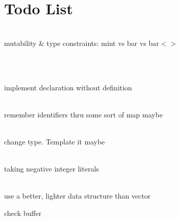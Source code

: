 \chapter{Todo List }
\hypertarget{todo}{}\label{todo}

\begin{DoxyRefList}
\item[{\parbox[t]{\linewidth}{Struct \doxylink{structast_1_1_declaration}{ast::\+Declaration} }}]\hfill \\
\label{todo__todo000001}%
%
mutability \& type constraints:\+ mint vs bar vs bar$<$$>$  
\item[{\parbox[t]{\linewidth}{Member \doxylink{_generator_8cpp_afc8e0ff085e39fb1db21128f8679ba7f}{Generator::\+generate\texorpdfstring{$<$}{<} ast::\+Exit \texorpdfstring{$>$}{>}} (const \doxylink{structast_1_1_exit}{ast::\+\+Exit} \&exit)}}]\hfill \\
\label{todo__todo000002}%
%
\item[{\parbox[t]{\linewidth}{Member \doxylink{_parser_8cpp_a24d36e725abb80c9fd72b3e3bd4be7c2}{Parser::\+parse\texorpdfstring{$<$}{<} ast::\+Declaration \texorpdfstring{$>$}{>}} ()}}]\hfill \\
\label{todo__todo000003}%
%
implement declaration without definition  
\item[{\parbox[t]{\linewidth}{Member \doxylink{_parser_8cpp_aac1258672c51c3ab2a16cb32d9f8c728}{Parser::\+parse\texorpdfstring{$<$}{<} ast::\+Identifier \texorpdfstring{$>$}{>}} ()}}]\hfill \\
\label{todo__todo000004}%
%
remember identifiers thru some sort of map maybe  
\item[{\parbox[t]{\linewidth}{Member \doxylink{struct_token_afd199ae9910ff4935f77a88b8d53cdd3}{Token::\+Token} (\doxylink{_token_8h_aa520fbf142ba1e7e659590c07da31921}{Token\+Type} type)}}]\hfill \\
\label{todo__todo000005}%
%
change type. Template it maybe  
\item[{\parbox[t]{\linewidth}{Class \doxylink{class_tokenizer}{Tokenizer} }}]\hfill \\
\label{todo__todo000008}%
%
taking negative integer literals  
\item[{\parbox[t]{\linewidth}{Member \doxylink{class_tokenizer_ab19d916cbacd6203c6e1782a3cbddaf8}{Tokenizer::\+tokenize} ()}}]\hfill \\
\label{todo__todo000006}%
%
use a better, lighter data structure than vector 

\label{todo__todo000007}%
%
check buffer 
\end{DoxyRefList}